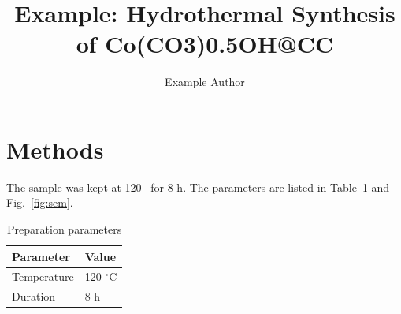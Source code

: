 \documentclass{article}
\title{Example: Hydrothermal Synthesis of Co(CO3)0.5OH@CC}
\author{Example Author}
\begin{document}
\maketitle

\section{Methods}
The sample was kept at 120 \celsius~for 8 h. %
The parameters are listed in Table~\ref{tab:params} and Fig.~\ref{fig:sem}. %

\begin{table}[htbp]
\centering
\caption{Preparation parameters}
\label{tab:params}
\begin{tabular}{ll}
\toprule
Parameter & Value \\
\midrule
Temperature & 120 $^{\circ}$C \\
Duration & 8 h \\
\bottomrule
\end{tabular}
\end{table}
\end{document}
